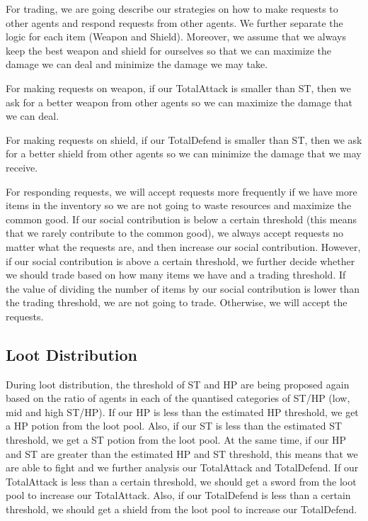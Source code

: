 \par For trading, we are going describe our strategies on how to make requests to other agents and respond requests from other agents. We further separate the logic for each item (Weapon and Shield). Moreover, we assume that we always keep the best weapon and shield for ourselves so that we can maximize the damage we can deal and minimize the damage we may take. 

\par For making requests on weapon, if our TotalAttack is smaller than ST, then we ask for a better weapon from other agents so we can maximize the damage that we can deal.

\par For making requests on shield, if our TotalDefend is smaller than ST, then we ask for a better shield from other agents so we can minimize the damage that we may receive.

\par For responding requests, we will accept requests more frequently if we have more items in the inventory so we are not going to waste resources and maximize the common good. If our social contribution is below a certain threshold (this means that we rarely contribute to the common good), we always accept requests no matter what the requests are, and then increase our social contribution. However, if our social contribution is above a certain threshold, we further decide whether we should trade based on how many items we have and a trading threshold. If the value of dividing the number of items by our social contribution is lower than the trading threshold, we are not going to trade. Otherwise, we will accept the requests.

\subsection{Loot Distribution}

\par During loot distribution, the threshold of ST and HP are being proposed again based on the ratio of agents in each of the quantised categories of ST/HP (low, mid and high ST/HP). If our HP is less than the estimated HP threshold, we get a HP potion from the loot pool. Also, if our ST is less than the estimated ST threshold, we get a ST potion from the loot pool. At the same time, if our HP and ST are greater than the estimated HP and ST threshold, this means that we are able to fight and we further analysis our TotalAttack and TotalDefend. If our TotalAttack is less than a certain threshold, we should get a sword from the loot pool to increase our TotalAttack. Also, if our TotalDefend is less than a certain threshold, we should get a shield from the loot pool to increase our TotalDefend.


